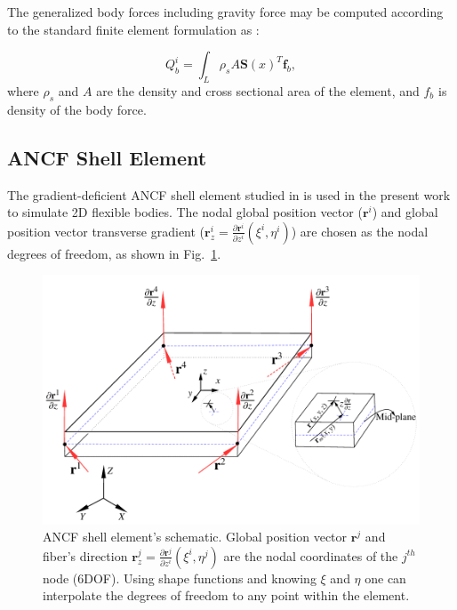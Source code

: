 The generalized body forces including gravity force may be computed according to the standard finite element formulation as :

\begin{equation} \label{eq:ANCF_Beam_Qb}
Q^i_b = \int_{L} \rho_s A \bm S(x)^T \bm f_b,
\end{equation}
where $\rho_s$ and $A$ are the density and cross sectional area of the element, and $f_b$ is density of the body force. 


\subsection{ANCF Shell Element}\label{sec:2DElem}
The gradient-deficient ANCF shell element studied in \cite{Yamashita2015continuum} is used in the present work to simulate 2D flexible bodies. The nodal global position vector ($\mathbf{r}^{i}$) and global position vector transverse gradient ($\mathbf{r}_{z}^{i}=\frac{\partial {{\mathbf{r}}^{i}}}{\partial {{z}^{i}}}({{\xi}^{i}},{{\eta}^{i}})$) are chosen as the nodal degrees of freedom, as shown in Fig.~\ref{fig:ANCF_Shells}.

\begin{figure}[!t]
	\begin{center}
		\includegraphics[width=.6\linewidth]{images/ANCF_2D.png}
	\end{center}
	\caption{ANCF shell element's schematic. Global position vector $\mathbf{r}^{j}$ and fiber's direction $\mathbf{r}_z^{j}=\frac{\partial {{\mathbf{r}}^{j}}}{\partial {{z}^{i}}}({{\xi}^{i}},{{\eta}^{j}})$ are the nodal coordinates of the $j^{th}$ node (6DOF). Using shape functions and knowing $\xi$ and $\eta$ one can interpolate the degrees of freedom to any point within the element. }\label{fig:ANCF_Shells}
\end{figure}

